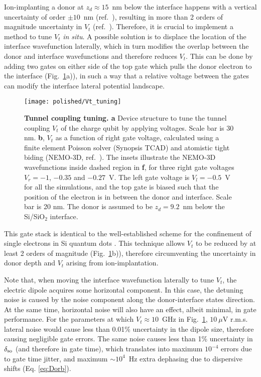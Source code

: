 Ion-implanting a donor at $z_d \approx 15$~nm below the interface happens with a vertical uncertainty of order $\pm 10$~nm (ref.~\cite{Donkelaar2015}), resulting in more than 2 orders of magnitude uncertainty in $V_t$ (ref.~\cite{Calderon2008}). Therefore, it is crucial to implement a method to tune $V_t$ \emph{in situ}. A possible solution is to displace the location of the interface wavefunction laterally, which in turn modifies the overlap between the donor and interface wavefunctions and therefore reduces $V_t$. This can be done by adding two gates on either side of the top gate which pulls the donor electron to the interface (Fig.~\ref{fig:Vt_tuning}a)), in such a way that a relative voltage between the gates can modify the interface lateral potential landscape. 

\begin{figure}[h]
	\centering
	\texttt{[image: polished/Vt\_tuning]}
	\caption[Tunnel coupling tuning]{\textbf{Tunnel coupling tuning. a} Device structure to tune the tunnel coupling $V_t$ of the charge qubit by applying voltages. Scale bar is 30 nm. 
		\textbf{b}, $V_t$ as a function of right gate voltage, calculated using a finite element Poisson solver (Synopsis\textsuperscript{\textregistered} TCAD) and atomistic tight biding (NEMO-3D, ref.~\cite{Klimeck2007}). The insets illustrate the NEMO-3D wavefunctions inside dashed region in \textbf{f}, for three right gate voltages $V_r=-1$, $-0.35$ and $-0.27$~V. The left gate voltage is $V_l=-0.5$~V for all the simulations, and the top gate is biased such that the position of the electron is in between the donor and interface. Scale bar is 20 nm. The donor is assumed to be $z_d=9.2$~nm below the Si/SiO$_2$ interface.}
	\label{fig:Vt_tuning}
\end{figure}

This gate stack is identical to the well-established scheme for the confinement of single electrons in Si quantum dots \cite{Veldhorst2014}. This technique allows $V_t$ to be reduced by at least 2 orders of magnitude (Fig.~\ref{fig:Vt_tuning}b)), therefore circumventing the uncertainty in donor depth and $V_t$ arising from ion-implantation.

Note that, when moving the interface wavefunction laterally to tune $V_t$, the electric dipole acquires some horizontal component. In this case, the detuning noise is caused by the noise component along the donor-interface states direction. At the same time, horizontal noise will also have an effect, albeit minimal, in gate performance. For the parameters at which $V_t\approx 10$~GHz in Fig.~\ref{fig:Vt_tuning}, $10~\mu$V r.m.s. lateral noise would cause less than 0.01\% uncertainty in the dipole size, therefore causing negligible gate errors. The same noise causes less than 1\% uncertainty in $\delta_{\rm so}$ (and therefore in gate time), which translates into maximum $10^{-4}$ errors due to gate time jitter, and maximum $\sim10^4$~Hz extra dephasing due to dispersive shifts (Eq. \ref{eq:Dorb}).

